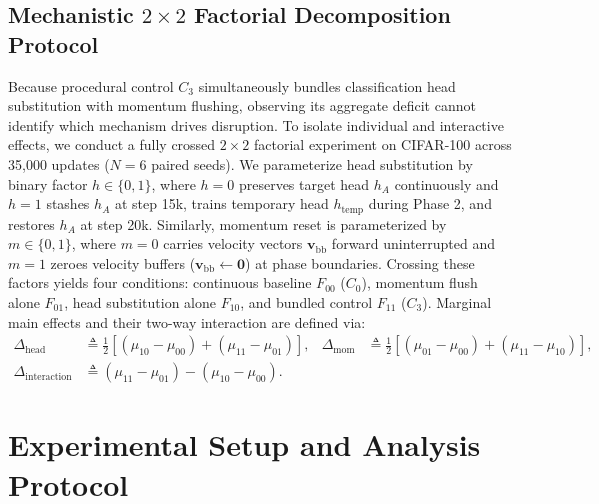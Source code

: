 \documentclass[10pt]{article}
\begin{document}
\subsection{Mechanistic \texorpdfstring{$2 \times 2$}{2x2} Factorial Decomposition Protocol}\label{subsec:schedule_factorial}

Because procedural control $C_3$ simultaneously bundles classification head substitution with momentum flushing, observing its aggregate deficit cannot identify which mechanism drives disruption. To isolate individual and interactive effects, we conduct a fully crossed $2 \times 2$ factorial experiment on CIFAR-100 across 35,000 updates ($N = 6$ paired seeds). We parameterize head substitution by binary factor $h \in \{0, 1\}$, where $h = 0$ preserves target head $h_A$ continuously and $h = 1$ stashes $h_A$ at step 15k, trains temporary head $h_{\mathrm{temp}}$ during Phase 2, and restores $h_A$ at step 20k. Similarly, momentum reset is parameterized by $m \in \{0, 1\}$, where $m = 0$ carries velocity vectors $\bm{v}_{\mathrm{bb}}$ forward uninterrupted and $m = 1$ zeroes velocity buffers ($\bm{v}_{\mathrm{bb}} \leftarrow \mathbf{0}$) at phase boundaries. Crossing these factors yields four conditions: continuous baseline $F_{00}$ ($C_0$), momentum flush alone $F_{01}$, head substitution alone $F_{10}$, and bundled control $F_{11}$ ($C_3$). Marginal main effects and their two-way interaction are defined via:
\begin{align}
    \Delta_{\mathrm{head}} &\triangleq \frac{1}{2} \left[ (\mu_{10} - \mu_{00}) + (\mu_{11} - \mu_{01}) \right], &
    \Delta_{\mathrm{mom}}  &\triangleq \frac{1}{2} \left[ (\mu_{01} - \mu_{00}) + (\mu_{11} - \mu_{10}) \right], \label{eq:factorial_mom} \\
    \Delta_{\mathrm{interaction}} &\triangleq (\mu_{11} - \mu_{01}) - (\mu_{10} - \mu_{00}). \label{eq:factorial_interaction}
\end{align}

\section{Experimental Setup and Analysis Protocol}\label{sec:protocol}
\end{document}
